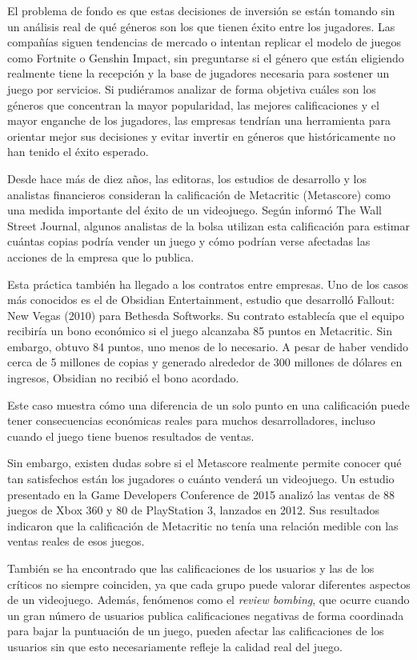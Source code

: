 \documentclass[letterpaper,11pt]{article}
\begin{document}
El problema de fondo es que estas decisiones de inversión se están tomando sin un análisis real de qué géneros son los que tienen éxito entre los jugadores. Las compañías siguen tendencias de mercado o intentan replicar el modelo de juegos como Fortnite o Genshin Impact, sin preguntarse si el género que están eligiendo realmente tiene la recepción y la base de jugadores necesaria para sostener un juego por servicios. Si pudiéramos analizar de forma objetiva cuáles son los géneros que concentran la mayor popularidad, las mejores calificaciones y el mayor enganche de los jugadores, las empresas tendrían una herramienta para orientar mejor sus decisiones y evitar invertir en géneros que históricamente no han tenido el éxito esperado.

Desde hace más de diez años, las editoras, los estudios de desarrollo y los analistas financieros consideran la calificación de Metacritic (Metascore) como una medida importante del éxito de un videojuego. Según informó The Wall Street Journal, algunos analistas de la bolsa utilizan esta calificación para estimar cuántas copias podría vender un juego y cómo podrían verse afectadas las acciones de la empresa que lo publica.

Esta práctica también ha llegado a los contratos entre empresas. Uno de los casos más conocidos es el de Obsidian Entertainment, estudio que desarrolló Fallout: New Vegas (2010) para Bethesda Softworks. Su contrato establecía que el equipo recibiría un bono económico si el juego alcanzaba 85 puntos en Metacritic. Sin embargo, obtuvo 84 puntos, uno menos de lo necesario. A pesar de haber vendido cerca de 5 millones de copias y generado alrededor de 300 millones de dólares en ingresos, Obsidian no recibió el bono acordado.

Este caso muestra cómo una diferencia de un solo punto en una calificación puede tener consecuencias económicas reales para muchos desarrolladores, incluso cuando el juego tiene buenos resultados de ventas.

Sin embargo, existen dudas sobre si el Metascore realmente permite conocer qué tan satisfechos están los jugadores o cuánto venderá un videojuego. Un estudio presentado en la Game Developers Conference de 2015 analizó las ventas de 88 juegos de Xbox 360 y 80 de PlayStation 3, lanzados en 2012. Sus resultados indicaron que la calificación de Metacritic no tenía una relación medible con las ventas reales de esos juegos.

También se ha encontrado que las calificaciones de los usuarios y las de los críticos no siempre coinciden, ya que cada grupo puede valorar diferentes aspectos de un videojuego. Además, fenómenos como el \textit{review bombing}, que ocurre cuando un gran número de usuarios publica calificaciones negativas de forma coordinada para bajar la puntuación de un juego, pueden afectar las calificaciones de los usuarios sin que esto necesariamente refleje la calidad real del juego.
\end{document}
